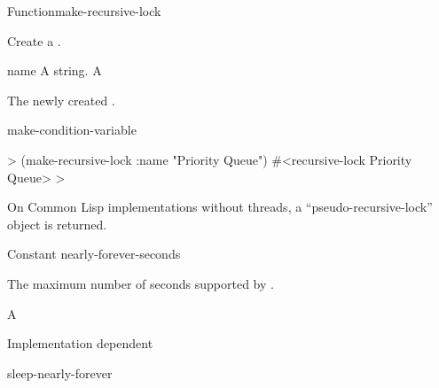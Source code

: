 \documentclass[10pt,twoside,english,pdftex]{article}
\begin{document}
\begin{functiondoc}{Function}{make-recursive-lock}{%
    }
%
%
%

\fnsyntax

\fnpurpose Create a .

\fnpackage {}

\fnmodule {}

\fnargs
\begin{args}{name}
\arg[name] A string.
\arg[lock] A 
\end{args}

\fnreturns The newly created . 

\begin{alsos}{make-condition-variable}
\end{alsos}

\fnexample
%
\W\supp
\begin{example}
  > (make-recursive-lock :name "Priority Queue")
  #<recursive-lock Priority Queue>
  >
\end{example}

\fnnote On Common Lisp implementations without threads, a
``pseudo-recursive-lock'' object is returned.

\end{functiondoc}


\begin{functiondoc}{Constant}%
  {nearly-forever-seconds}{}%

%

%

\fnsyntax

\fnpurpose The maximum number of seconds supported by .

\fnpackage {}

\fnmodule {}

\fnvaluetype A 

\fnvalue Implementation dependent

\begin{alsos}{sleep-nearly-forever}
\end{alsos}

\end{functiondoc}
\end{document}
